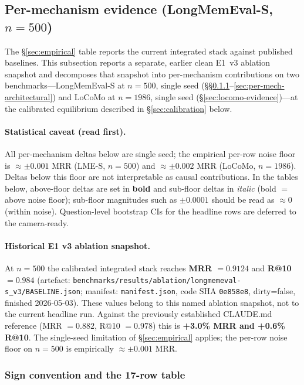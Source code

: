 \documentclass[11pt]{article}
\begin{document}
\subsection{Per-mechanism evidence (LongMemEval-S, $n{=}500$)}
\label{sec:per-mechanism}

The \S\ref{sec:empirical} table reports the current integrated stack against
published baselines.  This subsection reports a separate, earlier clean
E1~v3 ablation snapshot and decomposes that snapshot into per-mechanism
contributions on two benchmarks---LongMemEval-S
at $n{=}500$, single seed (\S\S\ref{sec:per-mech-table}--\ref{sec:per-mech-architectural})
and LoCoMo at $n{=}1986$, single seed (\S\ref{sec:locomo-evidence})---at
the calibrated equilibrium described in \S\ref{sec:calibration} below.

\paragraph{Statistical caveat (read first).}  All per-mechanism
deltas below are single seed; the empirical per-row noise floor is
$\approx \pm 0.001$ MRR (LME-S, $n{=}500$) and $\approx \pm 0.002$
MRR (LoCoMo, $n{=}1986$).  Deltas below this floor are not
interpretable as causal contributions.  In the tables below,
above-floor deltas are set in \textbf{bold} and sub-floor deltas in
\emph{italic} (bold $=$ above noise floor); sub-floor magnitudes
such as $\pm0.0001$ should be read as $\approx 0$ (within noise).
Question-level bootstrap CIs for the headline rows are deferred to
the camera-ready.

\paragraph{Historical E1 v3 ablation snapshot.}  At
$n{=}500$ the calibrated integrated stack reaches
\textbf{MRR $= 0.9124$} and \textbf{R@10 $= 0.984$}
(artefact: \texttt{benchmarks/results/ablation/longmemeval-s\_v3/BASELINE.json};
manifest: \texttt{manifest.json}, code SHA \texttt{0e858e8}, dirty=false,
finished 2026-05-03).  These values belong to this named ablation
snapshot, not to the current headline run.  Against the previously established CLAUDE.md
reference (MRR $= 0.882$, R@10 $= 0.978$) this is \textbf{+3.0\% MRR
and +0.6\% R@10}.  The single-seed limitation of \S\ref{sec:empirical}
applies; the per-row noise floor on $n{=}500$ is empirically
$\approx \pm 0.001$ MRR.

\subsubsection{Sign convention and the 17-row table}
\label{sec:per-mech-table}
\end{document}
